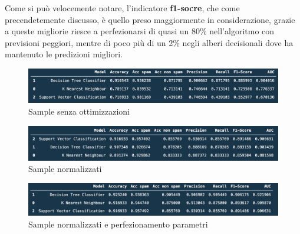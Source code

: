 \documentclass[12pt,a4paper]{article}
\begin{document}
Come si può velocemente notare, l'indicatore \textbf{f1-socre}, che come precendetemente discusso, è quello preso maggiormente in considerazione, grazie a queste migliorie riesce a perfezionarsi di quasi un 80\% nell'algoritmo con previsioni peggiori, mentre di poco più di un 2\% negli alberi decisionali dove ha mantenuto le predizioni migliori.

\begin{figure}[h]
    \centering
    \includegraphics[width=1\linewidth]{results_nothing.png}
    \caption{Sample senza ottimizzazioni}
\end{figure}

\begin{figure}[h]
    \centering
    \includegraphics[width=1\linewidth]{results_scaler.png}
    \caption{Sample normalizzati}
\end{figure}
    
\begin{figure}[h]
    \centering
    \includegraphics[width=1\linewidth]{results_optimized_all.png}
    \caption{Sample normalizzati e perfezionamento parametri}
\end{figure}
\end{document}
